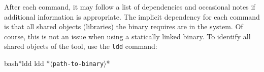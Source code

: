After each command, it may follow a list of dependencies and occasional notes if additional information is appropriate. The implicit dependency for each command is that all shared objects (libraries) the binary requires are in the system. Of course, this is not an issue when using a statically linked binary. To identify all shared objects of the tool, use the \texttt{ldd} command:
\begin{cmdline}{bash}{*}{ldd}{}
ldd *\textcolor{placeholder}{\texttt{$\langle$path-to-binary$\rangle$}}*
\end{cmdline}
